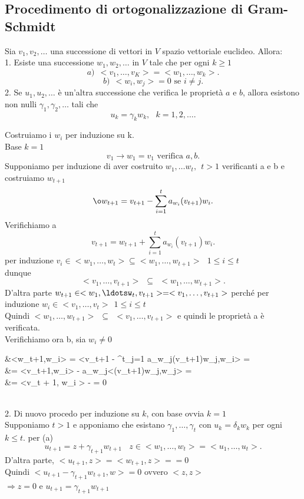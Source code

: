 \documentclass[12px]{article}
\begin{document}
\subsection{Procedimento di ortogonalizzazione di Gram-Schmidt}
\begin{lemm}
Sia $v_1,v_2,\ldots$ una successione di vettori in $V$ spazio  vettoriale euclideo. Allora:\\
1. Esiste una successione $w_1,w_2,\ldots$ in $V$ tale che per ogni $k\geq 1$
\[
a) \ \ <v_1, \ldots, v_K> = <w_1,\ldots,w_k>
.\] 
\[
	b) \ \ <w_i,w_j> = 0 \text{ se } i\neq j
.\] 
2. Se $u_1,u_2,\ldots$ è un'altra successione che verifica le proprietà $a$ e $b$, allora esistono non nulli $\gamma_1,\gamma_2,\ldots$ tali che
\[
u_k = \gamma_k w_k, \ \ \ k = 1,2,\ldots
.\] 
\end{lemm}
\begin{dimo}
	Costruiamo i $w_i$ per induzione su k. \\
	Base  $k = 1$ 
	\[
		v_1 \rightarrow w_1 = v_1 \text{ verifica }a,b
	.\] 
	Supponiamo per induzione di aver costruito $w_1,\ldots w_t, \ \ t >1$ verificanti a e b e costruiamo $w_{t+1}$
	\[
		\o w_{t+1} = v_{t+1} -\sum^t_{i=1}a_{w_i}(v_{t+1})w_i
	.\] 
	Verifichiamo a
	\[
		v_{t+1} = w_{t+1} + \sum^t_{i=1}a_{w_i}(v_{t+1})w_i
	.\] 
	per induzione $v_i\in <w_1,\ldots,w_t>\subseteq <w_1,\ldots,w_{t+1}> \ \ \ 1\leq i \leq t$\\
	dunque
	\[
		<v_1,\ldots,v_{t+1}> \ \ \subseteq\ \ <w_1,\ldots,w_{t+1}>
	.\] 
	D'altra parte $w_{t+1}\in<w_1,\ldotsw_t,v_{t+1}> = <v_1,\ldots,v_{t+1}>$ perché per induzione $w_i\in <v_1,\ldots, v_t> \ \ 1\leq i\leq t$ \\
	Quindi $<w_1,\ldots,w_{t+1}>\ \ \subseteq \ \ <v_1,\ldots, v_{t+1}>$ e quindi le proprietà a è verificata. \\ 
	Verifichiamo ora b, sia $w_i \neq 0$ \\
	\begin{aligned}
		&<w_{t+1},w_i> = <v_{t+1} - \sum^t_{j=1} a_{w_j}(v_{t+1})w_j,w_i> = \\
		&= <v_{t+1},w_i> - a_{w_j}<(v_{t+1})w_j,w_j> =\\
		&= <v_{t + 1}, w_i > -  = 0
	\end{aligned}
	\newpage \ \\ 
	2. Di nuovo procedo per induzione su $k$, con base ovvia $k=1$ \\
	Supponiamo $t>1$ e apponiamo che esistano $\gamma_1,\ldots,\gamma_t$ con $u_k = \delta_kw_k$ per ogni $k\leq t$. per (a)\\ 
	\[
		u_{t+1} = z + \gamma_{t+1}w_{t+1} \ \ \ \ z\in <w_1,\ldots,w_t> = <u_1,\ldots,u_t>
	.\] 
	D'altra parte, $<u_{t+1}, z> = <w_{t+1},z>= = 0$\\
	Quindi $<u_{t+1} - \gamma_{t+1}w_{t+1},w> = 0$ ovvero $<z,z>$ \\
	$ \Rightarrow z= 0$ e $u_{t+1}=\gamma_{t+1}w_{t+1}$
\end{dimo}
\end{document}
